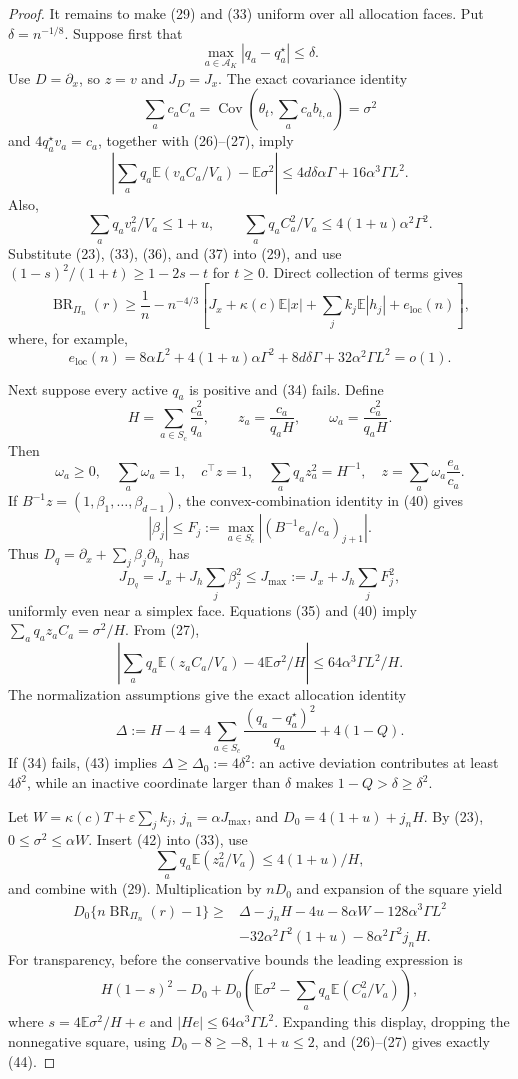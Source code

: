 \documentclass{article}
\begin{document}
\begin{proof}
It remains to make (29) and (33) uniform over all allocation faces.  Put \(\delta=n^{-1/8}\).  Suppose first that
\[
\max_{a\in\mathcal A_K}|q_a-q_a^\star|\le\delta.
\tag{34}
\]
Use \(D=\partial_x\), so \(z=v\) and \(J_D=J_x\).  The exact covariance identity
\[
\sum_ac_aC_a
=\operatorname{Cov}\left(\theta_t,\sum_ac_ab_{t,a}\right)=\sigma^2
\tag{35}
\]
and \(4q_a^\star v_a=c_a\), together with (26)--(27), imply
\[
\left|\sum_aq_a\mathbb E(v_aC_a/V_a)-\mathbb E\sigma^2\right|
\le4d\delta\alpha\Gamma+16\alpha^3\Gamma L^2.
\tag{36}
\]
Also,
\[
\sum_aq_av_a^2/V_a\le1+u,
\qquad
\sum_aq_aC_a^2/V_a\le4(1+u)\alpha^2\Gamma^2.
\tag{37}
\]
Substitute (23), (33), (36), and (37) into (29), and use \((1-s)^2/(1+t)\ge1-2s-t\) for \(t\ge0\).  Direct collection of terms gives
\[
\operatorname{BR}_{\Pi_n}(r)
\ge\frac1n-n^{-4/3}\left[J_x+\kappa(c)\mathbb E|x|
+\sum_jk_j\mathbb E|h_j|+e_{\mathrm{loc}}(n)\right],
\tag{38}
\]
where, for example,
\[
e_{\mathrm{loc}}(n)=8\alpha L^2+4(1+u)\alpha\Gamma^2
+8d\delta\Gamma+32\alpha^2\Gamma L^2=o(1).
\tag{39}
\]

Next suppose every active \(q_a\) is positive and (34) fails.  Define
\[
H=\sum_{a\in S_c}\frac{c_a^2}{q_a},
\qquad
z_a=\frac{c_a}{q_aH},
\qquad
\omega_a=\frac{c_a^2}{q_aH}.
\]
Then
\[
\omega_a\ge0,\quad \sum_a\omega_a=1,\quad c^\top z=1,\quad
\sum_aq_az_a^2=H^{-1},\quad
z=\sum_a\omega_a\frac{e_a}{c_a}.
\tag{40}
\]
If \(B^{-1}z=(1,\beta_1,\ldots,\beta_{d-1})\), the convex-combination identity in (40) gives
\[
|\beta_j|\le F_j:=\max_{a\in S_c}
\left|\left(B^{-1}e_a/c_a\right)_{j+1}\right|.
\]
Thus \(D_q=\partial_x+\sum_j\beta_j\partial_{h_j}\) has
\[
J_{D_q}=J_x+J_h\sum_j\beta_j^2
\le J_{\max}:=J_x+J_h\sum_jF_j^2,
\tag{41}
\]
uniformly even near a simplex face.  Equations (35) and (40) imply \(\sum_aq_az_aC_a=\sigma^2/H\).  From (27),
\[
\left|\sum_aq_a\mathbb E(z_aC_a/V_a)-4\mathbb E\sigma^2/H\right|
\le64\alpha^3\Gamma L^2/H.
\tag{42}
\]
The normalization assumptions give the exact allocation identity
\[
\Delta:=H-4
=4\sum_{a\in S_c}\frac{(q_a-q_a^\star)^2}{q_a}+4(1-Q).
\tag{43}
\]
If (34) fails, (43) implies \(\Delta\ge\Delta_0:=4\delta^2\): an active deviation contributes at least \(4\delta^2\), while an inactive coordinate larger than \(\delta\) makes \(1-Q>\delta\ge\delta^2\).

Let \(W=\kappa(c)T+\varepsilon\sum_jk_j\), \(j_n=\alpha J_{\max}\), and \(D_0=4(1+u)+j_nH\).  By (23), \(0\le\sigma^2\le\alpha W\).  Insert (42) into (33), use
\[
\sum_aq_a\mathbb E(z_a^2/V_a)\le4(1+u)/H,
\]
and combine with (29).  Multiplication by \(nD_0\) and expansion of the square yield
\[
\begin{split}
D_0\{n\operatorname{BR}_{\Pi_n}(r)-1\}\ge{}&
\Delta-j_nH-4u-8\alpha W-128\alpha^3\Gamma L^2\\
&-32\alpha^2\Gamma^2(1+u)-8\alpha^2\Gamma^2j_nH.
\end{split}
\tag{44}
\]
For transparency, before the conservative bounds the leading expression is
\[
H(1-s)^2-D_0+D_0\left(\mathbb E\sigma^2-\sum_aq_a\mathbb E(C_a^2/V_a)\right),
\]
where \(s=4\mathbb E\sigma^2/H+e\) and \(|He|\le64\alpha^3\Gamma L^2\).  Expanding this display, dropping the nonnegative square, using \(D_0-8\ge-8\), \(1+u\le2\), and (26)--(27) gives exactly (44).


\end{proof}
\end{document}
